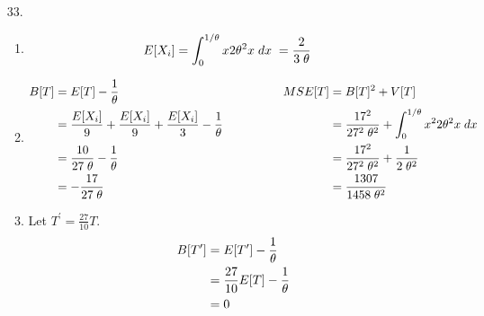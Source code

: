 \documentclass{article}
\def\prm{^\prime}
\def\dx{\; dx \;}
\begin{document}
\begin{enumerate}
\newpage
\item[33.]
\begin{enumerate}
\item
\begin{align}
	E[X_i] &= \int_0^{1/\theta} x 2 \theta^2 x \dx = \dfrac{2}{3 \; \theta} \notag
\end{align}

\item
\begin{align}
	B[T] &= E[T] - \dfrac{1}{\theta}
	&\hspace{4em} MSE[T] &= B[T]^2 + V[T]
	\notag\\
	&= \dfrac{E[X_i]}{9} + \dfrac{E[X_i]}{9} + \dfrac{E[X_i]}{3} - \dfrac{1}{\theta}
	&&= \dfrac{17^2}{27^2 \; \theta^2} + \int_0^{1/\theta} x^2 2 \theta^2 x \dx
	\notag\\
	&= \dfrac{10}{27 \; \theta} - \dfrac{1}{\theta}
	&&= \dfrac{17^2}{27^2 \; \theta^2} + \dfrac{1}{2 \; \theta^2}
	\notag\\
	&= -\dfrac{17}{27 \; \theta}
	&&= \dfrac{1307}{1458 \; \theta^2}
	\notag
\end{align}

\item
Let $T\prm = \frac{27}{10} T$.
\begin{align}
	B[T\prm] &= E[T\prm] - \dfrac{1}{\theta}
	\notag\\
	&= \dfrac{27}{10} E[T] - \dfrac{1}{\theta}
	\notag\\
	&= 0
	\notag
\end{align}
\end{enumerate}


\end{enumerate}
\end{document}
